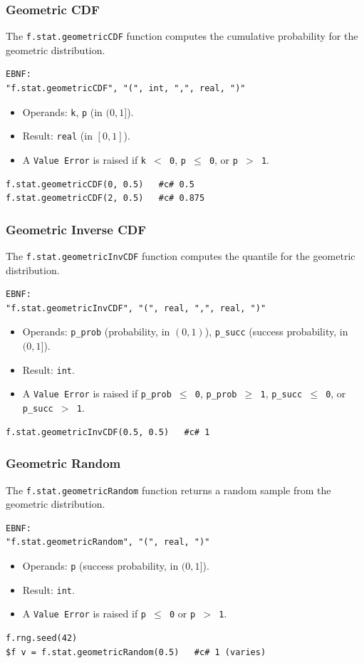 \subsubsection{Geometric CDF}
The \texttt{f.stat.geometricCDF} function computes the cumulative probability for the geometric distribution.
\begin{verbatim}
EBNF:
"f.stat.geometricCDF", "(", int, ",", real, ")"
\end{verbatim}
\begin{itemize}
\item Operands: \texttt{k}, \texttt{p} (in $(0, 1]$).
\item Result: \texttt{real} (in $[0, 1]$).
\item A \texttt{Value Error} is raised if \texttt{k $<$ 0}, \texttt{p $\leq$ 0}, or \texttt{p $>$ 1}.
\end{itemize}
\begin{verbatim}
f.stat.geometricCDF(0, 0.5)   #c# 0.5
f.stat.geometricCDF(2, 0.5)   #c# 0.875
\end{verbatim}

\subsubsection{Geometric Inverse CDF}
The \texttt{f.stat.geometricInvCDF} function computes the quantile for the geometric distribution.
\begin{verbatim}
EBNF:
"f.stat.geometricInvCDF", "(", real, ",", real, ")"
\end{verbatim}
\begin{itemize}
\item Operands: \texttt{p\_prob} (probability, in $(0, 1)$), \texttt{p\_succ} (success probability, in $(0, 1]$).
\item Result: \texttt{int}.
\item A \texttt{Value Error} is raised if \texttt{p\_prob $\leq$ 0}, \texttt{p\_prob $\geq$ 1}, \texttt{p\_succ $\leq$ 0}, or \texttt{p\_succ $>$ 1}.
\end{itemize}
\begin{verbatim}
f.stat.geometricInvCDF(0.5, 0.5)   #c# 1
\end{verbatim}

\subsubsection{Geometric Random}
The \texttt{f.stat.geometricRandom} function returns a random sample from the geometric distribution.
\begin{verbatim}
EBNF:
"f.stat.geometricRandom", "(", real, ")"
\end{verbatim}
\begin{itemize}
\item Operands: \texttt{p} (success probability, in $(0, 1]$).
\item Result: \texttt{int}.
\item A \texttt{Value Error} is raised if \texttt{p $\leq$ 0} or \texttt{p $>$ 1}.
\end{itemize}
\begin{verbatim}
f.rng.seed(42)
$f v = f.stat.geometricRandom(0.5)   #c# 1 (varies)
\end{verbatim}

